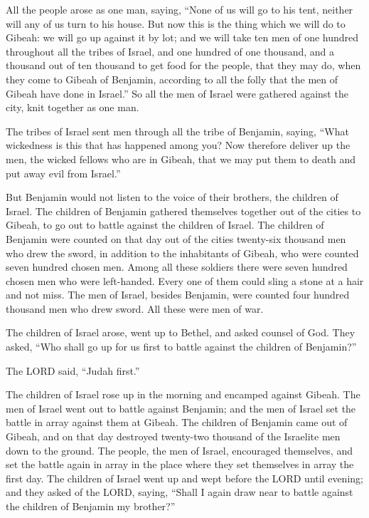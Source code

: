 \myverse{}All the people arose as one man, saying, “None of us will go to
his tent, neither will any of us turn to his house.
\myverse{}But now this is the thing which we will do to Gibeah: we will go up against
it by lot;
\myverse{}and we will take ten men of one hundred throughout all the tribes of Israel,
and one hundred of one thousand, and a thousand out of ten thousand to get food for the people, that they
may do, when they come to Gibeah of Benjamin, according to all the folly that the men of Gibeah have done
in Israel.”
\myverse{}So all the men of Israel were gathered against the city, knit together as
one man.

\myverse{}The tribes of Israel sent men through all the tribe of Benjamin,
saying, “What wickedness is this that has happened among you?
\myverse{}Now therefore deliver up the men, the wicked fellows who are in Gibeah, that
we may put them to death and put away evil from Israel.”

But Benjamin would not listen to the voice of their brothers, the children of Israel.
\myverse{}The children of Benjamin gathered themselves together out of the cities to
Gibeah, to go out to battle against the children of Israel.
\myverse{}The children of Benjamin were counted on that day out of the cities twenty-six
thousand men who drew the sword, in addition to the inhabitants of Gibeah, who were counted seven hundred
chosen men.
\myverse{}Among all these soldiers there were seven hundred chosen men who were left-handed.
Every one of them could sling a stone at a hair and not miss.
\myverse{}The men of Israel, besides Benjamin, were counted four hundred thousand men
who drew sword. All these were men of war.

\myverse{}The children of Israel arose, went up to Bethel, and asked counsel
of God. They asked, “Who shall go up for us first to battle against the children of Benjamin?”

The LORD said, “Judah first.”

\myverse{}The children of Israel rose up in the morning and encamped against
Gibeah.
\myverse{}The men of Israel went out to battle against Benjamin; and the men of Israel
set the battle in array against them at Gibeah.
\myverse{}The children of Benjamin came out of Gibeah, and on that day destroyed twenty-two
thousand of the Israelite men down to the ground.
\myverse{}The people, the men of Israel, encouraged themselves, and set the battle
again in array in the place where they set themselves in array the first day.
\myverse{}The children of Israel went up and wept before the LORD until evening; and
they asked of the LORD, saying, “Shall I again draw near to battle against the children of Benjamin my
brother?”

